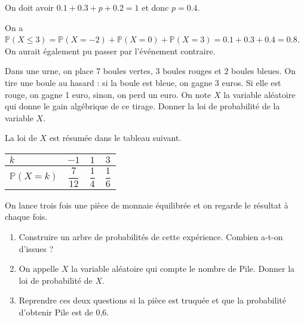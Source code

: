 \documentclass[11pt,fleqn, openany]{book} %
\begin{document}
\begin{solution}On doit avoir $0.1+0.3+p+0.2=1$ et donc $p=0.4$.

On a $\mathbb{P}(X\leqslant 3)=\mathbb{P}(X=-2)+\mathbb{P}(X=0)+\mathbb{P}(X=3)=0.1+0.3+0.4=0.8$. On aurait également pu passer par l'événement contraire.
\end{solution}




\begin{exercise}Dans une urne, on place 7 boules vertes, 3 boules rouges et 2 boules bleues. On tire une boule au hasard : si la boule est bleue, on gagne 3 euros. Si elle est rouge, on gagne 1 euro, sinon, on perd un euro. On note $X$ la variable aléatoire qui donne le gain algébrique de ce tirage. Donner la loi de probabilité de la variable $X$.\end{exercise}

\begin{solution}La loi de $X$ est résumée dans le tableau suivant.

\begin{center}
\begin{tabular}{|l|c|c|c|}
\hline
$k$ & $-1$ & $1$ & $3$ \\
\hline
$\mathbb{P}(X=k)$ & $\dfrac{7}{12}$ & $\dfrac{1}{4}$ & $\dfrac{1}{6}$ \\
\hline \end{tabular}
\end{center}\end{solution}




\begin{exercise}On lance trois fois une pièce de monnaie équilibrée et on regarde le résultat à chaque fois.
\begin{enumerate}
\item Construire un arbre de probabilités de cette expérience. Combien a-t-on d'issues ? 
\item On appelle $X$ la variable aléatoire qui compte le nombre de Pile. Donner la loi de probabilité de $X$.
\item Reprendre ces deux questions si la pièce est truquée et que la probabilité d'obtenir Pile est de 0,6.
\end{enumerate}\end{exercise}
\end{document}
